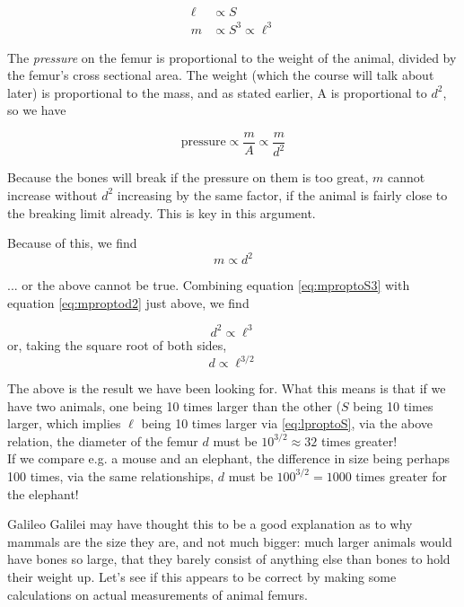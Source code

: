 \documentclass[8.01x]{subfiles}
\begin{document}
\begin{align}
 \ell &\propto S \label{eq:lproptoS}\\
 m &\propto S^3 \propto \ell^3 \label{eq:mproptoS3}
\end{align}

The \emph{pressure} on the femur is proportional to the weight of the animal, divided by the femur's cross sectional area. The weight (which the course will talk about later) is proportional to the mass, and as stated earlier, A is proportional to $d^2$, so we have

\begin{equation}
 \text{pressure} \propto \frac{m}{A} \propto \frac{m}{d^2}
\end{equation}

Because the bones will break if the pressure on them is too great, $m$ cannot increase without $d^2$ increasing by the same factor, if the animal is fairly close to the breaking limit already. This is key in this argument.

Because of this, we find
\begin{equation}
m \propto d^2 \label{eq:mproptod2}
\end{equation}

... or the above cannot be true.
Combining equation \eqref{eq:mproptoS3} with equation \eqref{eq:mproptod2} just above, we find

\begin{equation}
 d^2 \propto \ell^3
\end{equation}
or, taking the square root of both sides,
\begin{equation}
 d \propto \ell^{3/2} \label{eq:dproptoell32}
\end{equation}

The above is the result we have been looking for. What this means is that if we have two animals, one being 10 times larger than the other ($S$ being 10 times larger, which implies $\ell$ being 10 times larger via \eqref{eq:lproptoS}, via the above relation, the diameter of the femur $d$ must be $10^{3/2} \approx 32$ times greater!\\
If we compare e.g. a mouse and an elephant, the difference in size being perhaps 100 times, via the same relationships, $d$ must be $100^{3/2} = 1000$ times greater for the elephant!

Galileo Galilei may have thought this to be a good explanation as to why mammals are the size they are, and not much bigger: much larger animals would have bones so large, that they barely consist of anything else than bones to hold their weight up. Let's see if this appears to be correct by making some calculations on actual measurements of animal femurs.
\end{document}
